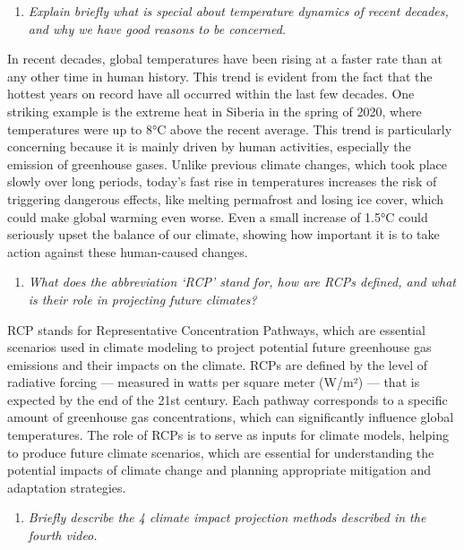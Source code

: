 \documentclass[
]{article}
\providecommand{\tightlist}{%
  \setlength{\itemsep}{0pt}\setlength{\parskip}{0pt}}
\begin{document}
\begin{enumerate}
\def\labelenumi{\arabic{enumi}.}
\setcounter{enumi}{1}
\tightlist
\item
  \emph{Explain briefly what is special about temperature dynamics of recent decades, and why we have good reasons to be concerned.}
\end{enumerate}

In recent decades, global temperatures have been rising at a faster rate than at any other time in human history. This trend is evident from the fact that the hottest years on record have all occurred within the last few decades. One striking example is the extreme heat in Siberia in the spring of 2020, where temperatures were up to 8°C above the recent average. This trend is particularly concerning because it is mainly driven by human activities, especially the emission of greenhouse gases. Unlike previous climate changes, which took place slowly over long periods, today's fast rise in temperatures increases the risk of triggering dangerous effects, like melting permafrost and losing ice cover, which could make global warming even worse. Even a small increase of 1.5°C could seriously upset the balance of our climate, showing how important it is to take action against these human-caused changes.

\begin{enumerate}
\def\labelenumi{\arabic{enumi}.}
\setcounter{enumi}{2}
\tightlist
\item
  \emph{What does the abbreviation `RCP' stand for, how are RCPs defined, and what is their role in projecting future climates?}
\end{enumerate}

RCP stands for Representative Concentration Pathways, which are essential scenarios used in climate modeling to project potential future greenhouse gas emissions and their impacts on the climate. RCPs are defined by the level of radiative forcing --- measured in watts per square meter (W/m²) --- that is expected by the end of the 21st century. Each pathway corresponds to a specific amount of greenhouse gas concentrations, which can significantly influence global temperatures. The role of RCPs is to serve as inputs for climate models, helping to produce future climate scenarios, which are essential for understanding the potential impacts of climate change and planning appropriate mitigation and adaptation strategies.

\begin{enumerate}
\def\labelenumi{\arabic{enumi}.}
\setcounter{enumi}{3}
\tightlist
\item
  \emph{Briefly describe the 4 climate impact projection methods described in the fourth video.}
\end{enumerate}
\end{document}
